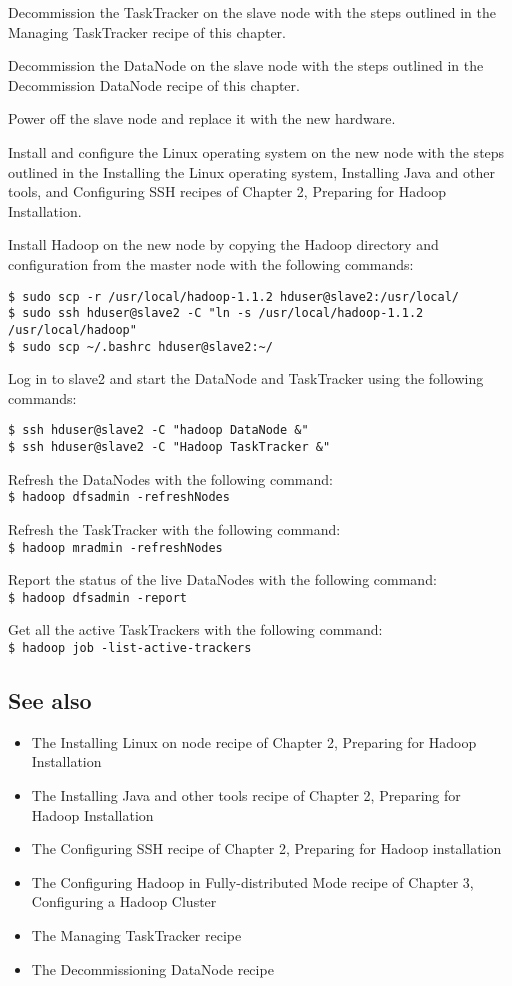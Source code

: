 Decommission the TaskTracker on the slave node with the steps outlined in the Managing TaskTracker recipe of this chapter. 

Decommission the DataNode on the slave node with the steps outlined in the Decommission DataNode recipe of this chapter. 


Power off the slave node and replace it with the new hardware.

Install and configure the Linux operating system on the new node with the steps outlined in the Installing the Linux operating system, Installing Java and other tools, and Configuring SSH recipes of Chapter 2, Preparing for Hadoop Installation.

Install Hadoop on the new node by copying the Hadoop directory and configuration from the master node with the following commands: \\
\begin{verbatim}
$ sudo scp -r /usr/local/hadoop-1.1.2 hduser@slave2:/usr/local/
$ sudo ssh hduser@slave2 -C "ln -s /usr/local/hadoop-1.1.2 /usr/local/hadoop"
$ sudo scp ~/.bashrc hduser@slave2:~/
\end{verbatim}

Log in to slave2 and start the DataNode and TaskTracker using the following commands: 
\begin{verbatim}
$ ssh hduser@slave2 -C "hadoop DataNode &"
$ ssh hduser@slave2 -C "Hadoop TaskTracker &" 
\end{verbatim}

Refresh the DataNodes with the following command: \\
\verb|$ hadoop dfsadmin -refreshNodes|

Refresh the TaskTracker with the following command: \\
\verb|$ hadoop mradmin -refreshNodes|

Report the status of the live DataNodes with the following command: \\
\verb|$ hadoop dfsadmin -report|

Get all the active TaskTrackers with the following command: \\
\verb|$ hadoop job -list-active-trackers|

\subsection*{See also}
\begin{itemize}
  \item The Installing Linux on node recipe of Chapter 2, Preparing for Hadoop Installation
  \item The Installing Java and other tools recipe of Chapter 2, Preparing for Hadoop Installation
  \item The Configuring SSH recipe of Chapter 2, Preparing for Hadoop installation
  \item The Configuring Hadoop in Fully-distributed Mode recipe of Chapter 3, Configuring a Hadoop Cluster
  \item The Managing TaskTracker recipe
  \item The Decommissioning DataNode recipe
\end{itemize}

